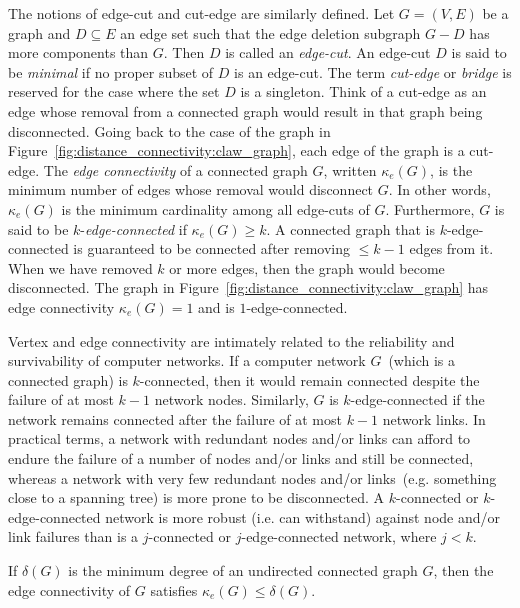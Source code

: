 The notions of edge-cut and cut-edge are similarly defined. Let
$G = (V,E)$ be a graph and $D \subseteq E$ an edge set such that the
edge deletion subgraph $G - D$ has more components than $G$. Then $D$
is called an \emph{edge-cut}. An edge-cut $D$ is said
to be \emph{minimal} if no proper subset of $D$ is an edge-cut. The
term \emph{cut-edge} or \emph{bridge} is
reserved for the case where the set $D$ is a singleton. Think of a
cut-edge as an edge whose removal from a connected graph would result
in that graph being disconnected. Going back to the case of the graph
in Figure~\ref{fig:distance_connectivity:claw_graph}, each edge of the
graph is a cut-edge. The \emph{edge connectivity} of a connected graph
$G$, written $\kappa_e(G)$, is the minimum number
of edges whose removal would disconnect $G$. In other words,
$\kappa_e(G)$ is the minimum cardinality among all edge-cuts of
$G$. Furthermore, $G$ is said to be
$k$-\emph{edge-connected} if
$\kappa_e(G) \geq k$. A connected graph that is $k$-edge-connected is
guaranteed to be connected after removing $\leq k - 1$ edges from
it. When we have removed $k$ or more edges, then the graph would
become disconnected. The graph in
Figure~\ref{fig:distance_connectivity:claw_graph} has edge
connectivity $\kappa_e(G) = 1$ and is $1$-edge-connected.

Vertex and edge connectivity are intimately related to the reliability
and survivability of computer networks. If a computer network
$G$~(which is a connected graph) is $k$-connected, then it would
remain connected despite the failure of at most $k - 1$ network
nodes. Similarly, $G$ is $k$-edge-connected if the network remains
connected after the failure of at most $k - 1$ network links. In
practical terms, a network with redundant nodes and/or links can
afford to endure the failure of a number of nodes and/or links and
still be connected, whereas a network with very few redundant nodes
and/or links~(e.g. something close to a spanning tree) is more prone
to be disconnected. A $k$-connected or $k$-edge-connected network is
more robust (i.e. can withstand) against node and/or link failures
than is a $j$-connected or $j$-edge-connected network, where $j < k$.

\begin{proposition}
If $\delta(G)$ is the minimum degree of an undirected connected graph
$G$, then the edge connectivity of $G$ satisfies
$\kappa_e(G) \leq \delta(G)$.
\end{proposition}

